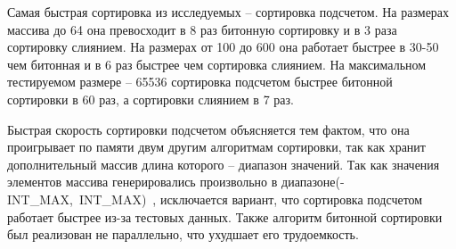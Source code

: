 Самая быстрая сортировка из исследуемых -- сортировка подсчетом. На размерах массива до 64 она превосходит в 8 раз битонную сортировку и в 3 раза сортировку слиянием. На размерах от 100 до 600 она работает быстрее в 30-50 чем битонная и в 6 раз быстрее чем сортировка слиянием. На максимальном тестируемом размере -- 65536 сортировка подсчетом быстрее битонной сортировки в 60 раз, а сортировки слиянием в 7 раз.  

Быстрая скорость сортировки подсчетом объясняется тем фактом, что она проигрывает по памяти двум другим алгоритмам сортировки, так как хранит дополнительный массив длина которого -- диапазон значений. Так как значения элементов массива генерировались произвольно в диапазоне\hspace{6mm}(-INT\_MAX,~INT\_MAX)~\cite{si}, исключается вариант, что сортировка подсчетом работает быстрее из-за тестовых данных. Также алгоритм битонной сортировки был реализован не параллельно, что ухудшает его трудоемкость.


